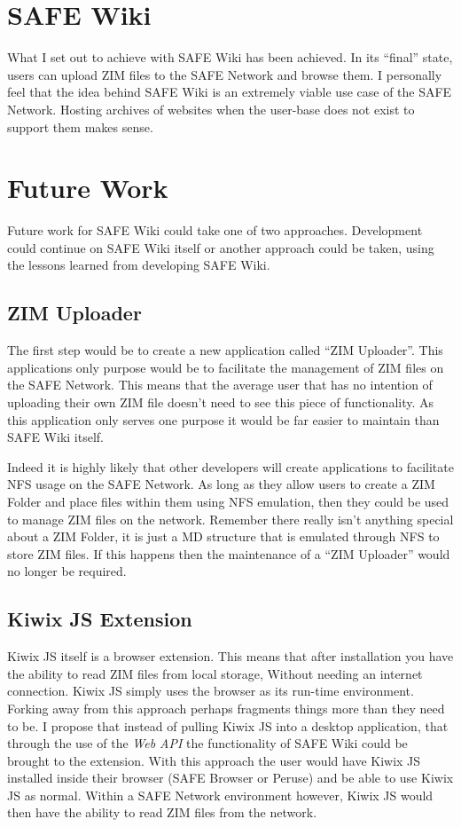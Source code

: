 \section{SAFE Wiki}

What I set out to achieve with SAFE Wiki has been achieved. In its ``final'' state, users can upload ZIM files to the SAFE Network and browse them. I personally feel that the idea behind SAFE Wiki is an extremely viable use case of the SAFE Network. Hosting archives of websites when the user-base does not exist to support them makes sense.

\section{Future Work}

Future work for SAFE Wiki could take one of two approaches. Development could continue on SAFE Wiki itself or another approach could be taken, using the lessons learned from developing SAFE Wiki.

\subsection{ZIM Uploader}

The first step would be to create a new application called ``ZIM Uploader''. This applications only purpose would be to facilitate the management of ZIM files on the SAFE Network. This means that the average user that has no intention of uploading their own ZIM file doesn't need to see this piece of functionality. As this application only serves one purpose it would be far easier to maintain than SAFE Wiki itself.

Indeed it is highly likely that other developers will create applications to facilitate NFS usage on the SAFE Network. As long as they allow users to create a ZIM Folder and place files within them using NFS emulation, then they could be used to manage ZIM files on the network. Remember there really isn't anything special about a ZIM Folder, it is just a MD structure that is emulated through NFS to store ZIM files. If this happens then the maintenance of a ``ZIM Uploader'' would no longer be required.

\subsection{Kiwix JS Extension}
\label{subsec:kiwix-js-safe}

Kiwix JS itself is a browser extension. This means that after installation you have the ability to read ZIM files from local storage, Without needing an internet connection. Kiwix JS simply uses the browser as its run-time environment. Forking away from this approach perhaps fragments things more than they need to be. I propose that instead of pulling Kiwix JS into a desktop application, that through the use of the \textit{Web API} the functionality of SAFE Wiki could be brought to the extension.  With this approach the user would have Kiwix JS installed inside their browser (SAFE Browser or Peruse) and be able to use Kiwix JS as normal. Within a SAFE Network environment however, Kiwix JS would then have the ability to read ZIM files from the network.

